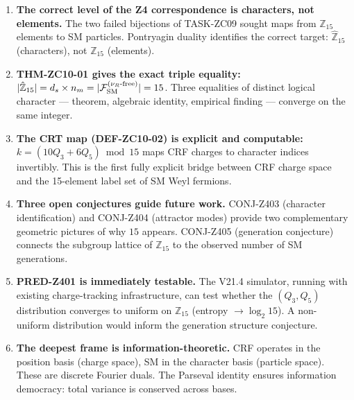 \documentclass[12pt, a4paper]{article}
\begin{document}
\begin{enumerate}[leftmargin=*]

\item \textbf{The correct level of the Z4 correspondence is
characters, not elements.} The two failed bijections of
TASK-ZC09 sought maps from $\mathbb{Z}_{15}$ elements to SM
particles. Pontryagin duality identifies the correct target:
$\hat{\mathbb{Z}}_{15}$ (characters), not $\mathbb{Z}_{15}$
(elements).

\item \textbf{THM-ZC10-01 gives the exact triple equality:}
$|\hat{\mathbb{Z}}_{15}| = d_s \times n_m =
|\mathcal{F}_{\rm SM}^{(\nu_R\text{-free})}| = 15$.
Three equalities of distinct logical character --- theorem,
algebraic identity, empirical finding --- converge on the
same integer.

\item \textbf{The CRT map (DEF-ZC10-02) is explicit and
computable:} $k = (10Q_3 + 6Q_5) \bmod 15$ maps CRF charges
to character indices invertibly. This is the first fully
explicit bridge between CRF charge space and the 15-element
label set of SM Weyl fermions.

\item \textbf{Three open conjectures guide future work.}
CONJ-Z403 (character identification) and CONJ-Z404 (attractor
modes) provide two complementary geometric pictures of why
$15$ appears. CONJ-Z405 (generation conjecture) connects the
subgroup lattice of $\mathbb{Z}_{15}$ to the observed number
of SM generations.

\item \textbf{PRED-Z401 is immediately testable.} The V21.4
simulator, running with existing charge-tracking infrastructure,
can test whether the $(Q_3, Q_5)$ distribution converges to
uniform on $\mathbb{Z}_{15}$ (entropy $\to \log_2 15$). A
non-uniform distribution would inform the generation structure
conjecture.

\item \textbf{The deepest frame is information-theoretic.}
CRF operates in the position basis (charge space), SM in
the character basis (particle space). These are discrete
Fourier duals. The Parseval identity ensures information
democracy: total variance is conserved across bases.

\end{enumerate}
\end{document}
